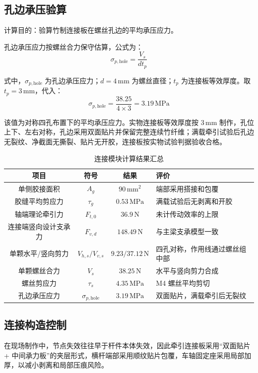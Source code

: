 \documentclass[UTF8,a4paper,12pt,fontset=none]{ctexart}
\numberwithin{equation}{section}
\numberwithin{figure}{section}
\numberwithin{table}{section}
\newcommand{\mm}{\,\mathrm{mm}}
\newcommand{\Nunit}{\,\mathrm{N}}
\newcommand{\MPa}{\,\mathrm{MPa}}
\begin{document}
\subsection{孔边承压验算}
计算目的：验算竹制连接板在螺丝孔边的平均承压应力。

孔边承压应力按螺丝合力保守估算，公式为：
\begin{equation}
  \sigma_{p,\mathrm{hole}}=\frac{V_s}{dt_p}
\end{equation}

式中，$\sigma_{p,\mathrm{hole}}$ 为孔边承压应力；$d=4\mm$ 为螺丝直径；$t_p$ 为连接板等效厚度。取 $t_p=3\mm$，代入：
\begin{equation}
  \sigma_{p,\mathrm{hole}}=\frac{38.25}{4\times3}=3.19\MPa
\end{equation}

该值为对称四孔布置下的平均承压应力。实物连接板等效厚度按 $3\mm$ 制作，孔位上下、左右对称，孔边采用双面贴片并保留完整连续竹纤维；满载牵引试验后孔边无裂纹、净截面无撕裂、贴片无开胶，连接板按实物试验判据验收合格。

\begin{table}[H]
\centering
\caption{连接模块计算结果汇总}
\label{tab:joint-summary}
\begin{tabularx}{\linewidth}{c c c Y}
\toprule
\textbf{项目} & \textbf{符号} & \textbf{结果} & \textbf{评价} \\\midrule
单侧胶接面积 & $A_g$ & $90\mm^2$ & 端部采用搭接和包覆 \\
胶缝平均剪应力 & $\tau_g$ & $0.53\MPa$ & 满载试验后无剥离和开胶 \\
轴端理论牵引力 & $F_{t,0}$ & $36.9\Nunit$ & 未计传动效率的上限 \\
连接端竖向设计支承力 & $F_{v,d}$ & $148.49\Nunit$ & 与主梁支承模型一致 \\
单颗水平/竖向剪力 & $V_{h,s}/V_{v,s}$ & $9.23/37.12\Nunit$ & 四孔对称，作用线通过螺丝组中部 \\
单颗螺丝合力 & $V_s$ & $38.25\Nunit$ & 水平与竖向剪力合成 \\
螺丝剪应力 & $\tau_s$ & $4.35\MPa$ & M4 螺丝平均剪切 \\
孔边承压应力 & $\sigma_{p,\mathrm{hole}}$ & $3.19\MPa$ & 双面贴片，满载牵引后无裂纹 \\
\bottomrule
\end{tabularx}
\end{table}

\subsection{连接构造控制}
在现场制作中，节点失效往往早于杆件本体失效，因此牵引连接板采用“双面贴片 + 中间承力板”的夹层形式，横杆端部采用顺纹贴片包覆，车轴固定座采用局部加厚，以减小剥离和局部压痕风险。
\end{document}
